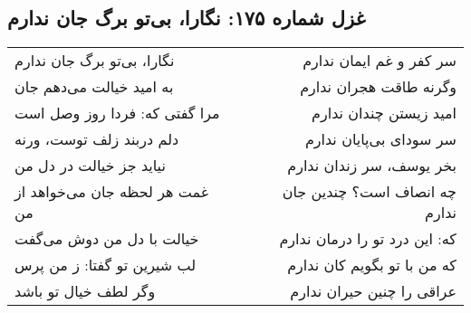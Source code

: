 \begin{center}
\section*{غزل شماره ۱۷۵: نگارا، بی‌تو برگ جان ندارم}
\label{sec:175}
\begin{longtable}{l p{0.5cm} r}
نگارا، بی‌تو برگ جان ندارم
&&
سر کفر و غم ایمان ندارم
\\
به امید خیالت می‌دهم جان
&&
وگرنه طاقت هجران ندارم
\\
مرا گفتی که: فردا روز وصل است
&&
امید زیستن چندان ندارم
\\
دلم دربند زلف توست، ورنه
&&
سر سودای بی‌پایان ندارم
\\
نیاید جز خیالت در دل من
&&
بخر یوسف، سر زندان ندارم
\\
غمت هر لحظه جان می‌خواهد از من
&&
چه انصاف است؟ چندین جان ندارم
\\
خیالت با دل من دوش می‌گفت
&&
که: این درد تو را درمان ندارم
\\
لب شیرین تو گفتا: ز من پرس
&&
که من با تو بگویم کان ندارم
\\
وگر لطف خیال تو باشد
&&
عراقی را چنین حیران ندارم
\\
\end{longtable}
\end{center}

